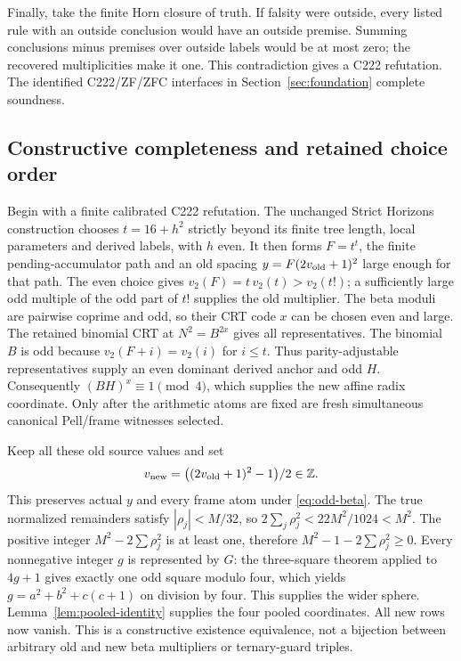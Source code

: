 Finally, take the finite Horn closure of truth. If falsity were outside,
every listed rule with an outside conclusion would have an outside
premise. Summing conclusions minus premises over outside labels would
be at most zero; the recovered multiplicities make it one. This
contradiction gives a C222 refutation. The identified C222/ZF/ZFC
interfaces in Section~\ref{sec:foundation} complete soundness.

\subsection{Constructive completeness and retained choice order}
Begin with a finite calibrated C222 refutation. The unchanged Strict
Horizons construction chooses $t=16+h^2$ strictly beyond its finite
tree length, local parameters and derived labels, with $h$ even.
It then forms $F=t^t$, the finite pending-accumulator path and an old
spacing $y=F(2v_{\rm old}+1)^2$ large enough for that path.
The even choice gives $v_2(F)=t\,v_2(t)>v_2(t!)$;
a sufficiently large odd multiple of the odd part of $t!$ supplies
the old multiplier. The beta moduli are pairwise coprime and odd,
so their CRT code $x$ can be chosen even and large. The retained
binomial CRT at $N^2=B^{2x}$ gives all representatives.
The binomial $B$ is odd because $v_2(F+i)=v_2(i)$ for $i\le t$.
Thus parity-adjustable representatives supply an even dominant derived
anchor and odd $H$. Consequently $(BH)^x\equiv1\pmod4$,
which supplies the new affine radix coordinate.
Only after the arithmetic atoms are fixed are fresh simultaneous
canonical Pell/frame witnesses selected.

Keep all these old source values and set
\[
 v_{\rm new}=\bigl((2v_{\rm old}+1)^2-1\bigr)/2\in\mathbb Z.
\]
This preserves actual $y$ and every frame atom under
\eqref{eq:odd-beta}. The true normalized remainders satisfy
$|\rho_j|<M/32$, so
$2\sum_j\rho_j^2<22M^2/1024<M^2$.
The positive integer $M^2-2\sum\rho_j^2$ is at least one,
therefore $M^2-1-2\sum\rho_j^2\ge0$.
Every nonnegative integer $g$ is represented by $G$: the three-square
theorem applied to $4g+1$ gives exactly one odd square modulo four,
which yields $g=a^2+b^2+c(c+1)$ on division by four.
This supplies the wider sphere. Lemma~\ref{lem:pooled-identity}
supplies the four pooled coordinates. All new rows now vanish.
This is a constructive existence equivalence, not a bijection between
arbitrary old and new beta multipliers or ternary-guard triples.


